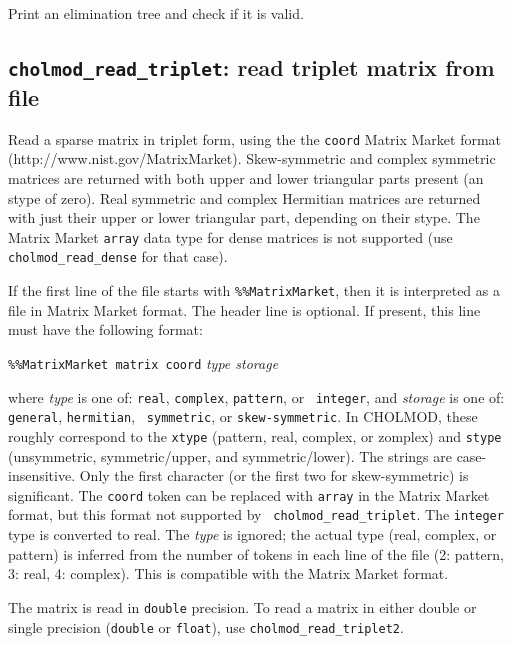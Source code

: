 \documentclass[11pt]{article}
\begin{document}

Print an elimination tree and check if it is valid.

\subsection{{\tt cholmod\_read\_triplet}: read triplet matrix from file}


Read a sparse matrix in triplet form, using the the {\tt coord} Matrix Market
format (http://www.nist.gov/MatrixMarket).  Skew-symmetric and complex
symmetric matrices are returned with both upper and lower triangular parts
present (an stype of zero).  Real symmetric and complex Hermitian matrices are
returned with just their upper or lower triangular part, depending on their
stype.  The Matrix Market {\tt array} data type for dense matrices is not
supported (use {\tt cholmod\_read\_dense} for that case).

If the first line of the file starts with {\tt \%\%MatrixMarket}, then it is
interpreted as a file in Matrix Market format.  The header line is optional.
If present, this line must have the following format:
\vspace{0.1in}

        {\tt \%\%MatrixMarket matrix coord} {\em type storage}

\vspace{0.1in}
\noindent
where {\em type} is one of: {\tt real}, {\tt complex}, {\tt pattern}, or {\tt
integer}, and {\em storage} is one of: {\tt general}, {\tt hermitian}, {\tt
symmetric}, or {\tt skew-symmetric}.  In CHOLMOD, these roughly correspond to
the {\tt xtype} (pattern, real, complex, or zomplex) and {\tt stype}
(unsymmetric, symmetric/upper, and symmetric/lower).  The strings are
case-insensitive.  Only the first character (or the first two for
skew-symmetric) is significant.  The {\tt coord} token can be replaced with
{\tt array} in the Matrix Market format, but this format not supported by {\tt
cholmod\_read\_triplet}.  The {\tt integer} type is converted to real.  The
{\em type} is ignored; the actual type (real, complex, or pattern) is inferred
from the number of tokens in each line of the file (2: pattern, 3: real, 4:
complex).  This is compatible with the Matrix Market format.

The matrix is read in {\tt double} precision.  To read a matrix
in either double or single precision ({\tt double} or {\tt float}),
use \verb'cholmod_read_triplet2'.
\end{document}
